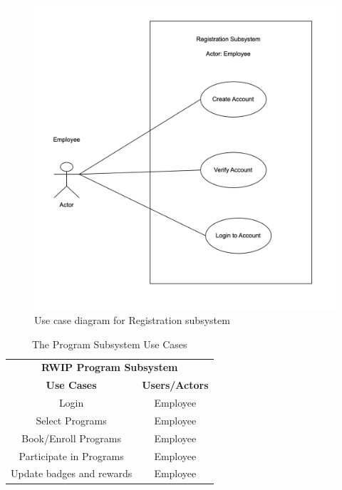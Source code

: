 \begin{figure}[h!t]
    \centering
    \includegraphics[width=\textwidth]{images/ucRegistration.png}
    \caption{Use case diagram for Registration subsystem}
    \label{fig:ucRegistration}
\end{figure}

\begin{table}[h!t]
\caption{The Program Subsystem Use Cases}
{%
\newcommand{\mc}[2]{\multicolumn{#1}{#2}}
\begin{center}
\begin{tabular}{|c|c|}
\hline
\multicolumn{2}{|c|}{\textbf{RWIP Program Subsystem}} \\ \cline{1-2}
\textbf{Use Cases} & \textbf{Users/Actors} \\
\hline
\rule{0pt}{24pt}  Login & Employee \\
\hline
\rule{0pt}{24pt}  Select Programs & Employee \\
\hline
\rule{0pt}{24pt}  Book/Enroll Programs & Employee \\
\hline
\rule{0pt}{24pt}  Participate in Programs & Employee \\
\hline
\rule{0pt}{24pt}  Update badges and rewards & Employee \\
\hline
\end{tabular}
\end{center}
}%
\label{tab:program}
\end{table}

